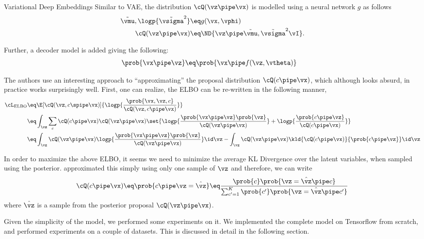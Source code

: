 \documentclass{article}
\begin{document}
\begin{psection}{Variational Deep Embeddings}
	Similar to VAE, the distribution $\cQ(\vz \pipe \vx)$ is modelled using a neural network $g$ as follows
	\begin{align*}
		\tilde{\vmu}, \logp{\tilde{\vsigma}^2} &\eq g(\vx, \vphi) \\
		\cQ(\vz \pipe \vx) &\eq \ND{\vz \pipe \tilde{\vmu}, \tilde{\vsigma}^2 \vI}.
	\end{align*}

	Further, a decoder model is added giving the following:
	\begin{align*}
		\prob{\vx \pipe \vz} &\eq \prob{\vx \pipe f(\vz, \vtheta)}
	\end{align*}

	The authors use an interesting approach to ``approximating'' the proposal distribution $\cQ(c \pipe \vx)$, which although looks absurd, in practice works surprisingly well. First, one can realize, the ELBO can be re-written in the following manner,
	\begin{align*}
		\cL_{\text{ELBO}} &\eq 	\E[\cQ(\vz, c \spipe \vx)]{\logp{\frac{\prob{\vx, \vz, c}}{\cQ(\vz, c \pipe \vx)}}} \\
		&\eq					\int_{\vz} \sum_{c} \cQ(c \pipe \vx) \cQ(\vz \pipe \vx) \set{\logp{\frac{\prob{\vx \pipe \vz} \prob{\vz}}{\cQ(\vz \pipe \vx)}} + \logp{\frac{\prob{c \pipe \vz}}{\cQ(c \pipe \vx)}}} \\
		&\eq \int_{\vz} \cQ(\vz \pipe \vx) \logp{\frac{\prob{\vx \pipe \vz} \prob{\vz}}{\cQ(\vz \pipe \vx)}} \id \vz - \int_{\vz} \cQ(\vz \pipe \vx) \kld{\cQ(c \pipe \vx)}{\prob{c \pipe \vz}} \id \vz
	\end{align*}

	In order to maximize the above ELBO, it seems we need to minimize the average KL Divergence over the latent variables, when sampled using the posterior.  approximated this simply using only one sample of $\vz$ and therefore, we can write 
	\begin{align*}
		\cQ(c \pipe \vx) \eq \prob{c \pipe \vz = \hat{\vz}} \eq \frac{\prob{c} \prob{\vz = \hat{\vz} \pipe c}}{\sum_{c' = 1}^{K} \prob{c'} \prob{\vz = \hat{\vz} \pipe c'}}
	\end{align*}
	where $\hat{\vz}$ is a sample from the posterior proposal $\cQ(\vz \pipe \vx)$.

	Given the simplicity of the model, we performed some experiments on it. We implemented the complete model on Tensorflow from scratch, and performed experiments on a couple of datasets. This is discussed in detail in the following section.
\end{psection}
\end{document}
